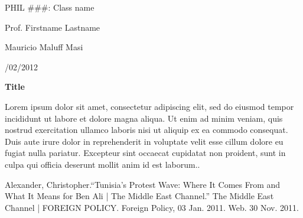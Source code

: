 \documentclass[letter,12pt]{article}
\begin{document}
\begin{spacing}{1}
\noindent PHIL \#\#\#: Class name

\noindent Prof. Firstname Lastname

\noindent Mauricio Maluff Masi

/02/2012 \\

\end{spacing}

{\centering
\textbf{Title}

}

Lorem ipsum dolor sit amet, consectetur adipiscing elit, sed do eiusmod tempor incididunt ut labore et dolore magna aliqua. Ut enim ad minim veniam, quis nostrud exercitation ullamco laboris nisi ut aliquip ex ea commodo consequat. Duis aute irure dolor in reprehenderit in voluptate velit esse cillum dolore eu fugiat nulla pariatur. Excepteur sint occaecat cupidatat non proident, sunt in culpa qui officia deserunt mollit anim id est laborum..

\begin{singlespace}
\begin{thebibliography}{9}

Alexander, Christopher.``Tunisia's Protest Wave: Where It Comes From and What It Means for Ben Ali | The Middle East Channel.'' The Middle East Channel | FOREIGN POLICY. Foreign Policy, 03 Jan. 2011. Web. 30 Nov. 2011.

\end{thebibliography}
\end{singlespace}
\end{document}
